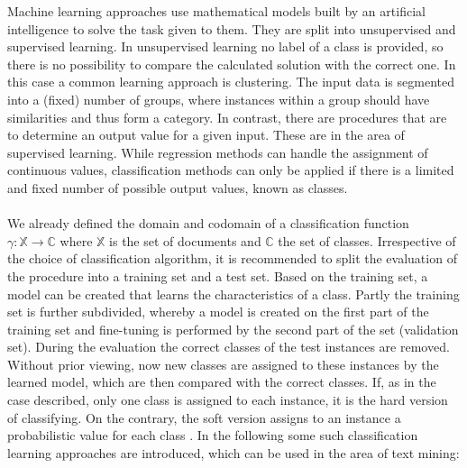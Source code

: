 \documentclass[article,type=msc,colorback,accentcolor=tud7b]{tudthesis}
\begin{document}
    
    Machine learning approaches use mathematical models built by an artificial intelligence to solve the task given to them. They are split into unsupervised and supervised learning. In unsupervised learning no label of a class is provided, so there is no possibility to compare the calculated solution with the correct one. In this case a common learning approach is clustering. The input data is segmented into a (fixed) number of groups, where instances within a group should have similarities and thus form a category. In contrast, there are procedures that are to determine an output value for a given input. These are in the area of supervised learning. While regression methods can handle the assignment of continuous values, classification methods can only be applied if there is a limited and fixed number of possible output values, known as classes. \\\\
    We already defined the domain and codomain of a classification function $\gamma:\mathbb{X}\rightarrow\mathbb{C}$ where $\mathbb{X}$ is the set of documents and $\mathbb{C}$ the set of classes. Irrespective of the choice of classification algorithm, it is recommended to split the evaluation of the procedure into a training set and a test set. Based on the training set, a model can be created that learns the characteristics of a class. Partly the training set is further subdivided, whereby a model is created on the first part of the training set and fine-tuning is performed by the second part of the set (validation set). During the evaluation the correct classes of the test instances are removed. Without prior viewing, now new classes are assigned to these instances by the learned model, which are then compared with the correct classes. If, as in the case described, only one class is assigned to each instance, it is the hard version of classifying. On the contrary, the soft version assigns to an instance a probabilistic value for each class \autocite{Aggarwal2012}. In the following some such classification learning approaches are introduced, which can be used in the area of text mining:
\end{document}
